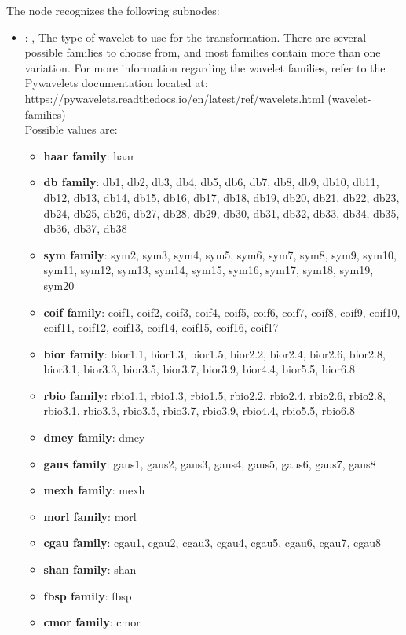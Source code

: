\begin{itemize}
      The  node recognizes the following subnodes:
      \begin{itemize}
        \item {}: ,
          The type of wavelet to use for the transformation.                     There are several
          possible families to choose from, and most families contain                     more than
          one variation. For more information regarding the wavelet families,
          refer to the Pywavelets documentation located at:
          https://pywavelets.readthedocs.io/en/latest/ref/wavelets.html (wavelet-families)
          \\                     Possible values are:                     \begin{itemize}
          \item \textbf{haar family}: haar                       \item \textbf{db family}: db1, db2,
          db3, db4, db5, db6, db7, db8, db9, db10, db11,                         db12, db13, db14,
          db15, db16, db17, db18, db19, db20, db21, db22, db23,                         db24, db25,
          db26, db27, db28, db29, db30, db31, db32, db33, db34, db35,                         db36,
          db37, db38                       \item \textbf{sym family}: sym2, sym3, sym4, sym5, sym6,
          sym7, sym8, sym9, sym10,                         sym11, sym12, sym13, sym14, sym15, sym16,
          sym17, sym18, sym19, sym20                       \item \textbf{coif family}: coif1, coif2,
          coif3, coif4, coif5, coif6, coif7, coif8,                         coif9, coif10, coif11,
          coif12, coif13, coif14, coif15, coif16, coif17                       \item \textbf{bior
          family}: bior1.1, bior1.3, bior1.5, bior2.2, bior2.4, bior2.6,
          bior2.8, bior3.1, bior3.3, bior3.5, bior3.7, bior3.9, bior4.4, bior5.5,
          bior6.8                       \item \textbf{rbio family}: rbio1.1, rbio1.3, rbio1.5,
          rbio2.2, rbio2.4, rbio2.6,                         rbio2.8, rbio3.1, rbio3.3, rbio3.5,
          rbio3.7, rbio3.9, rbio4.4, rbio5.5,                         rbio6.8
          \item \textbf{dmey family}: dmey                       \item \textbf{gaus family}: gaus1,
          gaus2, gaus3, gaus4, gaus5, gaus6, gaus7, gaus8                       \item \textbf{mexh
          family}: mexh                       \item \textbf{morl family}: morl
          \item \textbf{cgau family}: cgau1, cgau2, cgau3, cgau4, cgau5, cgau6, cgau7, cgau8
          \item \textbf{shan family}: shan                       \item \textbf{fbsp family}: fbsp
          \item \textbf{cmor family}: cmor                     \end{itemize}


\end{itemize}
\end{itemize}
